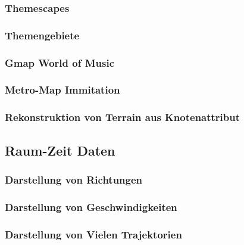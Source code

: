             \subsubsection{Themescapes} %

            \subsubsection{Themengebiete} %

            \subsubsection{Gmap World of Music} %

            \subsubsection{Metro-Map Immitation} %

            \subsubsection{Rekonstruktion von Terrain aus Knotenattribut} %

        \subsection{Raum-Zeit Daten} %

            \subsubsection{Darstellung von Richtungen} %

            \subsubsection{Darstellung von Geschwindigkeiten} %

            \subsubsection{Darstellung von Vielen Trajektorien} %
